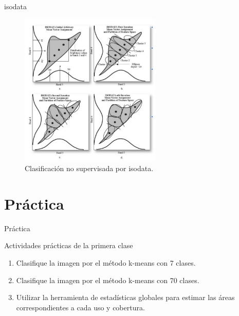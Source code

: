 \documentclass[handout]{beamer}
\begin{document}
\begin{frame}{isodata}
  \begin{figure}
    \includegraphics[width=0.6\textwidth]{imagenes/isodata.png}
    \caption{Clasificación no supervisada por isodata.}
  \end{figure}
\end{frame}

\section{Práctica}

\begin{frame}{Práctica}
  \begin{exampleblock}{Actividades prácticas de la primera clase}
    \begin{enumerate}
      \item Clasifique la imagen por el método k-means con 7 clases.
      \item Clasifique la imagen por el método k-means con 70 clases.
      \item Utilizar la herramienta de estadísticas globales para estimar las áreas correspondientes a cada uso y cobertura.
    \end{enumerate}
  \end{exampleblock}
\end{frame}
\end{document}
